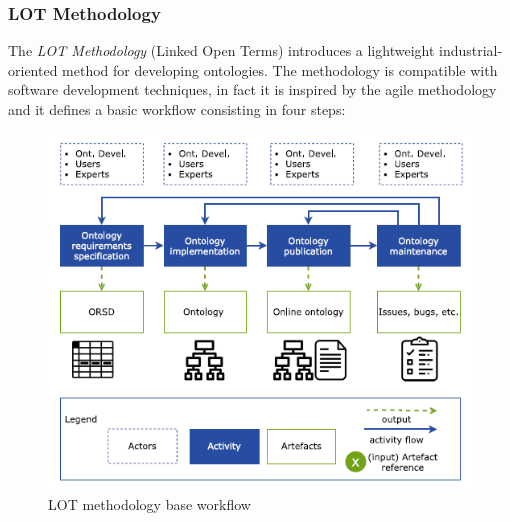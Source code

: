 \subsubsection{LOT Methodology}
The \textit{LOT Methodology} (Linked Open Terms) \cite{poveda2022lot} introduces a lightweight industrial-oriented method for developing ontologies. The methodology is compatible with software development techniques, in fact it is inspired by the agile methodology and it defines a basic workflow consisting in four steps:
\begin{figure}[H]
    \centering
    \includegraphics[width=0.7\linewidth]{Figures/fig_3.png}
    \caption{LOT methodology base workflow}
    \label{fig:enter-label}
\end{figure}


